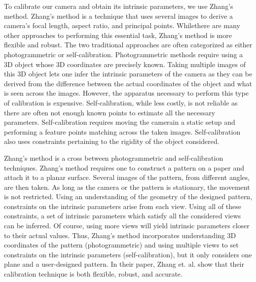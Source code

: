 \label{s:camera}

To calibrate our camera and obtain its intrinsic parameters, we use Zhang’s method. 
Zhang’s method is a technique that uses several images to derive a camera’s focal length, aspect ratio, and principal points. Whilethere are many other approaches to performing this essential task, Zhang’s method is more flexible and robust. The two traditional approaches are often categorized as either photogrammetric or self-calibration. Photogrammetric methods require using a 3D object whose 3D coordinates are precisely known. Taking multiple images of this 3D object lets one infer the intrinsic parameters of the camera as they can be derived from the difference between the actual coordinates of the object and what is seen across the images. However, the apparatus necessary to perform this type of calibration is expensive. Self-calibration, while less costly, is not reliable as there are often not enough known points to estimate all the necessary parameters. Self-calibration requires moving the camerain a static setup and performing a feature points matching across the taken images. Self-calibration also uses constraints pertaining to the rigidity of the object considered.

Zhang’s method is a cross between photogrammetric and self-calibration techniques. Zhang’s method requires one to construct a pattern on a paper and attach it to a planar surface. Several images of the pattern, from different angles, are then taken. As long as the camera or the pattern is stationary, the movement is not restricted. Using an understanding of the geometry of the designed pattern, constraints on the intrinsic parameters arise from each view. Using all of these constraints, a set of intrinsic parameters which satisfy all the considered views can be inferred. Of course, using more views will yield intrinsic parameters closer to their actual values. Thus, Zhang’s method incorporates understanding 3D coordinates of the pattern  (photogrammetric) and using multiple views to set constraints on the intrinsic parameters (self-calibration), but it only considers one plane and a user-designed pattern. In their paper, Zhang et. al. show that their calibration technique is both flexible, robust, and accurate. 

